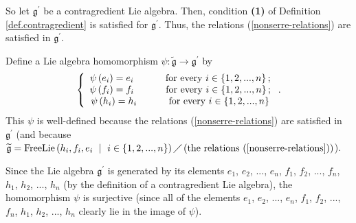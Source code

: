 \documentclass[etingof-lie.tex]{subfiles}
\begin{document}
So let $\mathfrak{g}^{\prime}$ be a contragredient Lie algebra. Then,
condition \textbf{(1)} of Definition \ref{def.contragredient} is satisfied for
$\mathfrak{g}^{\prime}$. Thus, the relations (\ref{nonserre-relations}) are
satisfied in $\mathfrak{g}^{\prime}$.

Define a Lie algebra homomorphism $\psi:\widetilde{\mathfrak{g}}%
\rightarrow\mathfrak{g}^{\prime}$ by%
\[
\left\{
\begin{array}
[c]{c}%
\psi\left(  e_{i}\right)  =e_{i}\ \ \ \ \ \ \ \ \ \ \text{for every }%
i\in\left\{  1,2,...,n\right\}  ;\\
\psi\left(  f_{i}\right)  =f_{i}\ \ \ \ \ \ \ \ \ \ \text{for every }%
i\in\left\{  1,2,...,n\right\}  ;\\
\psi\left(  h_{i}\right)  =h_{i}\ \ \ \ \ \ \ \ \ \ \text{for every }%
i\in\left\{  1,2,...,n\right\}
\end{array}
\right.  .
\]
This $\psi$ is well-defined because the relations (\ref{nonserre-relations})
are satisfied in $\mathfrak{g}^{\prime}$ (and because $\widetilde{\mathfrak{g}%
}=\operatorname*{FreeLie}\left(  h_{i},f_{i},e_{i}\ \mid\ i\in\left\{
1,2,...,n\right\}  \right)  \diagup\left(  \text{the relations
(\ref{nonserre-relations})}\right)  $).

Since the Lie algebra $\mathfrak{g}^{\prime}$ is generated by its elements
$e_{1}$, $e_{2}$, $...$, $e_{n}$, $f_{1}$, $f_{2}$, $...$, $f_{n}$, $h_{1}$,
$h_{2}$, $...$, $h_{n}$ (by the definition of a contragredient Lie algebra),
the homomorphism $\psi$ is surjective (since all of the elements $e_{1}$,
$e_{2}$, $...$, $e_{n}$, $f_{1}$, $f_{2}$, $...$, $f_{n}$, $h_{1}$, $h_{2}$,
$...$, $h_{n}$ clearly lie in the image of $\psi$).
\end{document}
